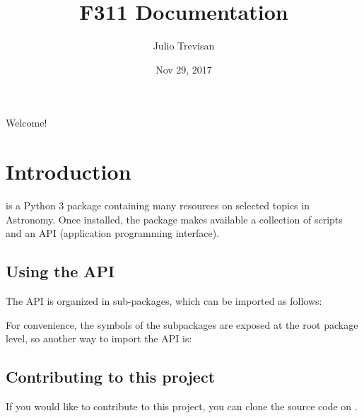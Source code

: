 \documentclass[letterpaper,10pt,english]{sphinxmanual}
\title{F311 Documentation}
\date{Nov 29, 2017}
\author{Julio Trevisan}
\begin{document}
\maketitle
\sphinxtableofcontents
{}\label{\detokenize{index::doc}}


Welcome!


\chapter{Introduction}
\label{\detokenize{intro:introduction}}\label{\detokenize{intro::doc}}\label{\detokenize{intro:f311-astronomy-related-python-3-api-and-scripts}}
 is a Python 3 package containing many resources on selected topics in Astronomy.
Once installed, the package makes available a collection of scripts and an API
(application programming interface).


\section{Using the API}
\label{\detokenize{intro:using-the-api}}
The API is organized in sub-packages, which can be imported as follows:

\begin{sphinxVerbatim}[commandchars=\\\{\}]
   
   
   
   
   
   
\end{sphinxVerbatim}

For convenience, the symbols of the subpackages are exposed at the root package level, so
another way to import the API is:

\begin{sphinxVerbatim}[commandchars=\\\{\}]
 
\end{sphinxVerbatim}


\section{Contributing to this project}
\label{\detokenize{intro:contributing-to-this-project}}
If you would like to contribute to this project, you can clone the source code on
.
\end{document}
